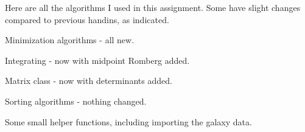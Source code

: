 Here are all the algorithms I used in this assignment. Some have slight changes compared
to previous handins, as indicated.

\noindent Minimization algorithms - all new.



\noindent Integrating - now with midpoint Romberg added.



\noindent Matrix class - now with determinants added.



\noindent Sorting algorithms - nothing changed.



\noindent Some small helper functions, including importing the galaxy data.

